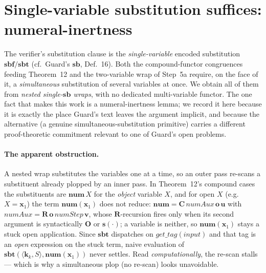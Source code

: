 \documentclass[11pt]{article}
\theoremstyle{plain}
\theoremstyle{definition}
\theoremstyle{remark}
\newcommand{\sbf}{\mathbf{sbf}}
\newcommand{\sbt}{\mathbf{sbt}}
\newcommand{\num}{\mathbf{num}}
\newcommand{\seq}[1]{\langle #1 \rangle}
\begin{document}
\section{Single-variable substitution suffices: numeral-inertness}
\label{sec:sb2}

The verifier's substitution clause is the \emph{single-variable} encoded
substitution $\sbf/\sbt$ (cf.\ Guard's $\mathbf{sb}$, Def.~16).  Both the
compound-functor congruences feeding Theorem~12 and the two-variable wrap of
Step~5a require, on the face of it, a \emph{simultaneous} substitution of
several variables at once.  We obtain all of them from \emph{nested
single-$\mathbf{sb}$ wraps}, with no dedicated multi-variable functor.  The
one fact that makes this work is a numeral-inertness lemma; we record it
here because it is exactly the place Guard's text leaves the argument
implicit, and because the alternative (a genuine simultaneous-substitution
primitive) carries a different proof-theoretic commitment relevant to one of
Guard's open problems.

\paragraph{The apparent obstruction.}  A nested wrap substitutes the
variables one at a time, so an outer pass re-scans a substituent already
plopped by an inner pass.  In Theorem~12's compound cases the substituents
are $\num\,X$ for the \emph{object} variable $X$, and for open $X$ (e.g.\
$X=\mathbf{x}_1$) the term $\num(\mathbf{x}_1)$ does not reduce:
$\num = \mathbf{C}\,\mathit{numAux}\,\mathbf{o}\,\mathbf{u}$ with
$\mathit{numAux}=\mathbf{R}\,\mathbf{o}\,\mathit{numStep}\,\mathbf{v}$, whose
$\mathbf{R}$-recursion fires only when its second argument is syntactically
$\mathbf{O}$ or $\mathbf{s}(\cdot)$; a variable is neither, so
$\num(\mathbf{x}_1)$ stays a stuck open application.  Since $\sbt$ dispatches
on $\mathit{get\_tag}(\mathit{input})$ and that tag is an \emph{open}
expression on the stuck term, naive evaluation of
$\sbt(\seq{\mathbf{k}_k, S}, \num(\mathbf{x}_1))$ never settles.  Read
\emph{computationally}, the re-scan stalls --- which is why a simultaneous
plop (no re-scan) looks unavoidable.
\end{document}

